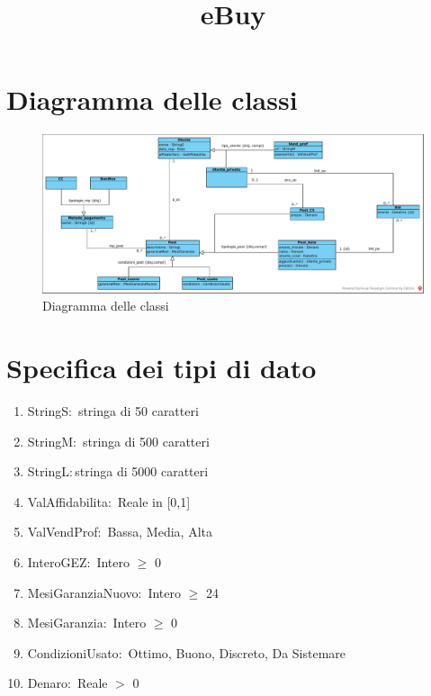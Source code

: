 \documentclass{article}
\title{eBuy}
\author{}
\date{}
\begin{document}
\maketitle

\tableofcontents

\newpage

\section{\label{sec:DiagrammaDelleClassi}Diagramma delle classi}
\begin{figure}[h]
    \centering
    \includegraphics[width=1\textwidth]{../Diagrammi/diagramma delle classi.pdf}
    \caption{Diagramma delle classi}
\end{figure}

\newpage
\section{\label{Sec:SpecificaTipoDiDato}Specifica dei tipi di dato}

\begin{enumerate}
    \item\label{sec:TipoStringS}StringS$:$ stringa di 50 caratteri
    \item\label{sec:TipoStringM}StringM$:$ stringa di 500 caratteri
    \item\label{sec:TipoStringL}StringL$:$stringa di 5000 caratteri
    \item\label{sec:TipoValAffidabilita}ValAffidabilita$:$ Reale in [0,1]
    \item\label{sec:TipoValVendProf}ValVendProf$:$ {Bassa, Media, Alta}
    \item\label{sec:TipoInteroGEZ}InteroGEZ$:$ Intero $\geq$ 0
    \item\label{sec:TipoMesiGaranziaNuovo}MesiGaranziaNuovo$:$ Intero $\geq$ 24
    \item\label{sec:TipoMesiGaranzia}MesiGaranzia$:$ Intero $\geq$ 0
    \item\label{sec:TipoCondizioniUsato}CondizioniUsato$:$ {Ottimo, Buono, Discreto, Da Sistemare}
    \item\label{sec:TipoDenaro}Denaro$:$ Reale $>$ 0
\end{enumerate}
\end{document}
